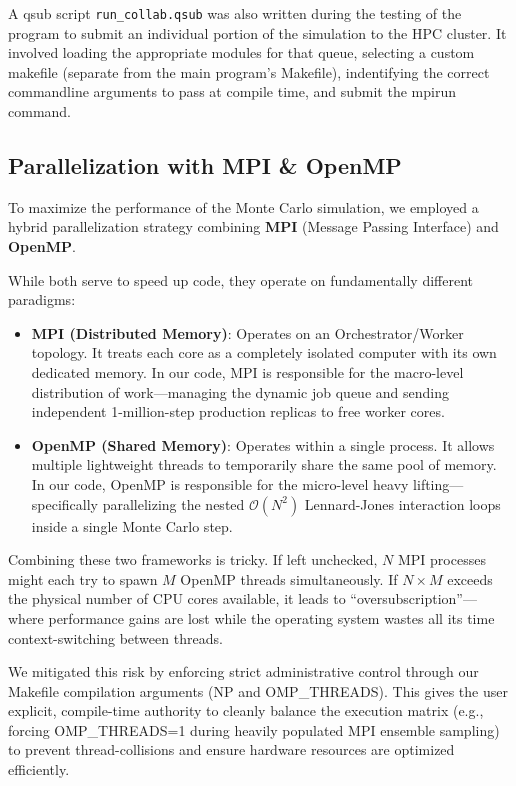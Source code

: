 \documentclass[
]{article}
\providecommand{\tightlist}{%
  \setlength{\itemsep}{0pt}\setlength{\parskip}{0pt}}
\begin{document}
A qsub script \texttt{run\_collab.qsub} was also written during the
testing of the program to submit an individual portion of the simulation
to the HPC cluster. It involved loading the appropriate modules for that
queue, selecting a custom makefile (separate from the main program's
Makefile), indentifying the correct commandline arguments to pass at
compile time, and submit the mpirun command.

\subsection{Parallelization with MPI \&
OpenMP}\label{parallelization-with-mpi-openmp}

To maximize the performance of the Monte Carlo simulation, we employed a
hybrid parallelization strategy combining \textbf{MPI} (Message Passing
Interface) and \textbf{OpenMP}.

While both serve to speed up code, they operate on fundamentally
different paradigms:

\begin{itemize}
\tightlist
\item
  \textbf{MPI (Distributed Memory)}: Operates on an Orchestrator/Worker
  topology. It treats each core as a completely isolated computer with
  its own dedicated memory. In our code, MPI is responsible for the
  macro-level distribution of work---managing the dynamic job queue and
  sending independent 1-million-step production replicas to free worker
  cores.
\item
  \textbf{OpenMP (Shared Memory)}: Operates within a single process. It
  allows multiple lightweight threads to temporarily share the same pool
  of memory. In our code, OpenMP is responsible for the micro-level
  heavy lifting---specifically parallelizing the nested
  \(\mathcal{O}(N^2)\) Lennard-Jones interaction loops inside a single
  Monte Carlo step.
\end{itemize}

Combining these two frameworks is tricky. If left unchecked, \(N\) MPI
processes might each try to spawn \(M\) OpenMP threads simultaneously.
If \(N \times M\) exceeds the physical number of CPU cores available, it
leads to ``oversubscription''---where performance gains are lost while
the operating system wastes all its time context-switching between
threads.

We mitigated this risk by enforcing strict administrative control
through our Makefile compilation arguments (NP and OMP\_THREADS). This
gives the user explicit, compile-time authority to cleanly balance the
execution matrix (e.g., forcing OMP\_THREADS=1 during heavily populated
MPI ensemble sampling) to prevent thread-collisions and ensure hardware
resources are optimized efficiently.
\end{document}
